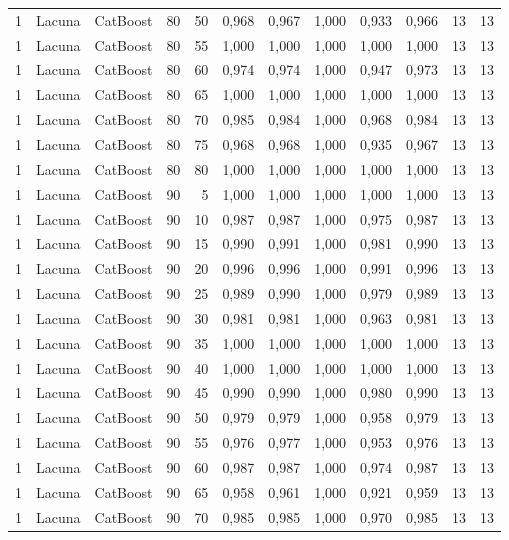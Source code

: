 \begin{longtable}{@{}rllrrrrrrrrr@{}}
1 & Lacuna & CatBoost & 80 & 50 & 0,968 & 0,967 & 1,000 & 0,933 & 0,966 & 13 & 13 \\
1 & Lacuna & CatBoost & 80 & 55 & 1,000 & 1,000 & 1,000 & 1,000 & 1,000 & 13 & 13 \\
1 & Lacuna & CatBoost & 80 & 60 & 0,974 & 0,974 & 1,000 & 0,947 & 0,973 & 13 & 13 \\
1 & Lacuna & CatBoost & 80 & 65 & 1,000 & 1,000 & 1,000 & 1,000 & 1,000 & 13 & 13 \\
1 & Lacuna & CatBoost & 80 & 70 & 0,985 & 0,984 & 1,000 & 0,968 & 0,984 & 13 & 13 \\
1 & Lacuna & CatBoost & 80 & 75 & 0,968 & 0,968 & 1,000 & 0,935 & 0,967 & 13 & 13 \\
1 & Lacuna & CatBoost & 80 & 80 & 1,000 & 1,000 & 1,000 & 1,000 & 1,000 & 13 & 13 \\
1 & Lacuna & CatBoost & 90 & 5 & 1,000 & 1,000 & 1,000 & 1,000 & 1,000 & 13 & 13 \\
1 & Lacuna & CatBoost & 90 & 10 & 0,987 & 0,987 & 1,000 & 0,975 & 0,987 & 13 & 13 \\
1 & Lacuna & CatBoost & 90 & 15 & 0,990 & 0,991 & 1,000 & 0,981 & 0,990 & 13 & 13 \\
1 & Lacuna & CatBoost & 90 & 20 & 0,996 & 0,996 & 1,000 & 0,991 & 0,996 & 13 & 13 \\
1 & Lacuna & CatBoost & 90 & 25 & 0,989 & 0,990 & 1,000 & 0,979 & 0,989 & 13 & 13 \\
1 & Lacuna & CatBoost & 90 & 30 & 0,981 & 0,981 & 1,000 & 0,963 & 0,981 & 13 & 13 \\
1 & Lacuna & CatBoost & 90 & 35 & 1,000 & 1,000 & 1,000 & 1,000 & 1,000 & 13 & 13 \\
1 & Lacuna & CatBoost & 90 & 40 & 1,000 & 1,000 & 1,000 & 1,000 & 1,000 & 13 & 13 \\
1 & Lacuna & CatBoost & 90 & 45 & 0,990 & 0,990 & 1,000 & 0,980 & 0,990 & 13 & 13 \\
1 & Lacuna & CatBoost & 90 & 50 & 0,979 & 0,979 & 1,000 & 0,958 & 0,979 & 13 & 13 \\
1 & Lacuna & CatBoost & 90 & 55 & 0,976 & 0,977 & 1,000 & 0,953 & 0,976 & 13 & 13 \\
1 & Lacuna & CatBoost & 90 & 60 & 0,987 & 0,987 & 1,000 & 0,974 & 0,987 & 13 & 13 \\
1 & Lacuna & CatBoost & 90 & 65 & 0,958 & 0,961 & 1,000 & 0,921 & 0,959 & 13 & 13 \\
1 & Lacuna & CatBoost & 90 & 70 & 0,985 & 0,985 & 1,000 & 0,970 & 0,985 & 13 & 13 \\

\end{longtable}
